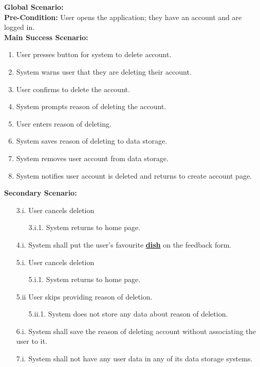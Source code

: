 \documentclass[]{article}
\begin{document}
\begin{enumerate}[{\bf BE1.}]
		{\bf Global Scenario:} \\
		\textbf{Pre-Condition:} User opens the application; they have an account and are logged in. \\
		\textbf{Main Success Scenario:} 
		\begin{enumerate}[{1.}]
			\item User presses button for system to delete account.
			\item System warns user that they are deleting their account.
			\item User confirms to delete the account.
			\item System prompts reason of deleting the account.
			\item User enters reason of deleting.
			\item System saves reason of deleting to data storage.
			\item System removes user account from data storage.
			\item System notifies user account is deleted and returns to create account page.
		\end{enumerate}
		\textbf{Secondary Scenario:}
		\begin{enumerate}
			\item[3.i.] User cancels deletion
			\begin{enumerate}
				\item[3.i.1.] System returns to home page. 
			\end{enumerate}
		\end{enumerate}
		\begin{enumerate}
			\item[4.i.] System shall put the user's favourite \hyperref[Dish]{\textbf{dish}} on the feedback form.
			\item[5.i.] User cancels deletion
			\begin{enumerate}
				\item[5.i.1.] System returns to home page. 
			\end{enumerate}
			\item [5.ii] User skips providing reason of deletion.
			\begin{enumerate}
				\item[5.ii.1.] System does not store any data about reason of deletion.
			\end{enumerate}
			\item [6.i.] System shall save the reason of deleting account without associating the user to it.
			\item [7.i.] System shall not have any user data in any of its data storage systems.
		\end{enumerate}
		
\end{enumerate}
\end{document}
